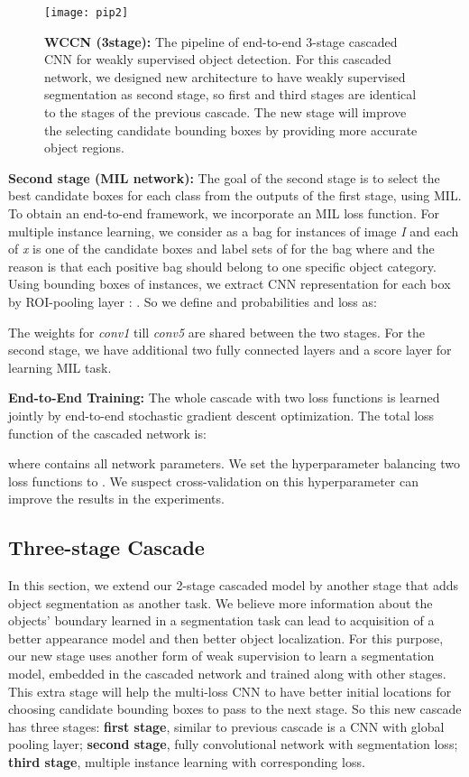 \documentclass[10pt,twocolumn,letterpaper]{article}
\begin{document}
 \begin{figure*}[ht]
 \centering
 \texttt{[image: pip2]}
 \caption{\textbf{WCCN (3stage):} The pipeline of end-to-end 3-stage cascaded CNN for weakly supervised object detection. For this cascaded network, we designed new architecture to have weakly supervised segmentation as second stage, so first and third stages are identical to the stages of the previous cascade. The new stage will improve the selecting candidate bounding boxes by providing more accurate object regions.}
  \label{fig:3}
 \end{figure*}
 
\textbf{Second stage (MIL network):} The goal of the second stage is to select the best candidate boxes for each class from the outputs of the first stage, using MIL. To obtain an end-to-end framework, we incorporate an MIL loss function. For multiple instance learning, we consider  as a bag for instances of image \textit{I} and each of \textit{x} is one of the candidate boxes and label sets of  for the bag where  and the reason is that each positive bag should belong to one specific object category. Using bounding boxes of instances, we extract CNN representation for each box by ROI-pooling layer \cite{fastRCNN}: . So we define and probabilities and loss as: 


The weights for \textit{conv1} till \textit{conv5} are shared between the two stages. For the second stage, we have additional two fully connected layers and a score layer for learning MIL task.

\textbf{End-to-End Training:} The whole cascade with two loss functions is learned jointly by end-to-end stochastic gradient descent optimization. The total loss function of the cascaded network is:

\noindent where  contains all network parameters. We set the hyperparameter balancing two loss functions to . We suspect cross-validation on this hyperparameter can improve the results in the experiments.



\subsection{Three-stage Cascade}
In this section, we extend our 2-stage cascaded model by another stage that adds object segmentation as another task. We believe more information about the objects' boundary learned in a segmentation task can lead to acquisition of a better appearance model and then better object localization. For this purpose, our new stage uses another form of weak supervision to learn a segmentation model, embedded in the cascaded network and trained along with other stages. This extra stage will help the multi-loss CNN to have better initial locations for choosing candidate bounding boxes to pass to the next stage. So this new cascade has three stages: \textbf{first stage}, similar to previous cascade is a CNN with global pooling layer; \textbf{second stage}, fully convolutional network with segmentation loss; \textbf{third stage}, multiple instance learning with corresponding loss.
\end{document}

